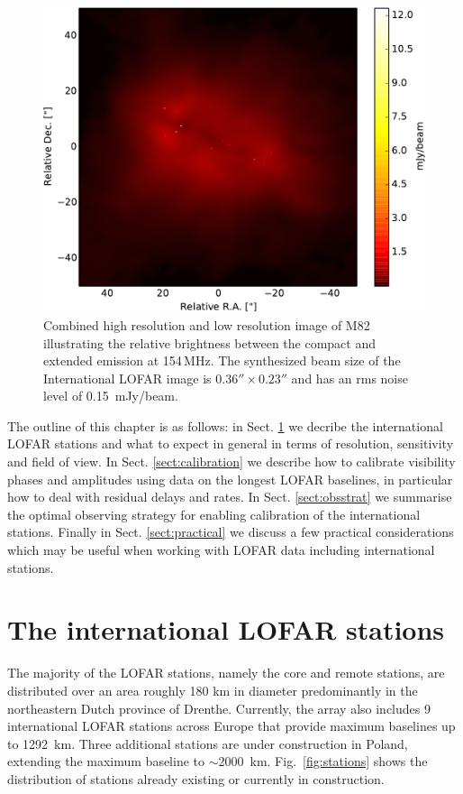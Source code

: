 \documentclass[graybox]{svmult}
\begin{document}
\begin{figure}
\begin{center}
\includegraphics[width=\textwidth]{figures/M82HIGH_FEATHER-crop.pdf}
\caption{Combined high resolution and low resolution image of M82 illustrating
the relative brightness between the compact and extended emission at 154\,MHz.
The synthesized beam size of the International LOFAR image is
$0.36''\times0.23''$ and has an rms noise level of 0.15~mJy/beam. \citep{varenius15}}
\label{fig:m82}
\end{center}
\end{figure}

The outline of this chapter is as follows: in Sect. \ref{sect:intlofar} we
decribe the international LOFAR stations and what to expect in general in
terms of resolution, sensitivity and field of view. In Sect. \ref{sect:calibration}
we describe how to calibrate visibility phases and amplitudes using
data on the longest LOFAR baselines, in particular how to deal
with residual delays and rates. In Sect. \ref{sect:obsstrat} we summarise
the optimal observing strategy for enabling calibration of the international
stations. Finally in Sect. \ref{sect:practical} we discuss a few practical
considerations which may be useful when working with LOFAR data including
international stations.

\section{The international LOFAR stations}
\label{sect:intlofar}
The majority of the LOFAR stations, namely the core and remote stations, are
distributed over an area roughly 180 km in diameter predominantly in the
northeastern Dutch province of Drenthe. Currently, the array also includes 9
international LOFAR stations across Europe that provide maximum baselines up to
1292~km. Three additional stations are under construction in Poland,
extending the maximum baseline to $\sim$2000~km. Fig.~\ref{fig:stations} shows
the distribution of stations already existing or currently in construction.
\end{document}
